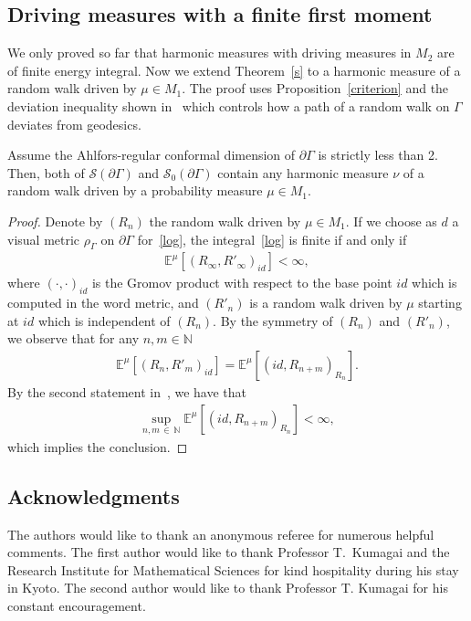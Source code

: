 \documentclass[AHL,Unicode,longabstracts,published]{cedram}
\newcommand{\cs}{\mathcal{S}}
\newcommand{\bn}{\mathbb{N}}
\newcommand{\be}{\mathbb{E}}
\begin{document}
\subsection{Driving measures with a finite first moment}

We only proved so far that harmonic measures with driving measures in $M_2$ are of finite energy integral. Now we extend Theorem~\ref{s} to a harmonic measure of a random walk driven by $\mu\in M_1$. The proof uses Proposition~\ref{criterion} and the deviation inequality shown in~\cite{MS} which controls how a path of a random walk on $\Gamma$ deviates from geodesics.

\begin{theo}\label{1st}
Assume the Ahlfors-regular conformal dimension of $\partial\Gamma$ is strictly less than 2. Then, both of $\cs(\partial \Gamma)$ and $\cs_0(\partial\Gamma)$ contain any harmonic measure $\nu$ of a random walk driven by a probability measure $\mu\in M_1$.
\end{theo}

\begin{proof}
Denote by $(R_n)$ the random walk driven by $\mu\in M_1$. If we choose as $d$ a visual metric $\rho_{\Gamma}$ on $\partial\Gamma$ for~\eqref{log}, the integral~\eqref{log} is finite if and only if
\begin{align*}
\be^{\mu}\left[(R_{\infty},R'_{\infty})_{id}\right]<\infty,
\end{align*}
where $(\cdot,\cdot)_{id}$ is the Gromov product with respect to the base point $id$ which is computed in the word metric, and $(R'_n)$ is a random walk driven by $\mu$ starting at $id$ which is independent of $(R_n)$. By the symmetry of $(R_n)$ and $(R'_n)$, we observe that for any $n,m\in\bn$
\begin{align*}
\be^{\mu}\left[(R_{n},R'_{m})_{id}\right]=\be^{\mu}\left[(id,R_{n+m})_{R_n}\right].
\end{align*}
By the second statement in~\cite[Theorem~11.1]{MS}, we have that
\begin{align*}
\sup_{n,m\,\in\,\bn}\be^{\mu}\left[(id,R_{n+m})_{R_n}\right]<\infty,
\end{align*}
which implies the conclusion.
\end{proof}

\subsection*{Acknowledgments}
The authors would like to thank an anonymous referee for numerous helpful comments. The first author would like to thank Professor T.~Kumagai and the Research Institute for Mathematical Sciences for kind hospitality during his stay in Kyoto. The second author would like to thank Professor T. Kumagai for his constant encouragement.



\end{document}
